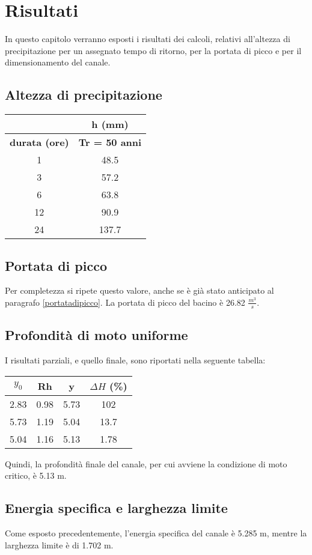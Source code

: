 \section{Risultati}
In questo capitolo verranno esposti i risultati dei calcoli, relativi all'altezza di precipitazione per un assegnato tempo di ritorno, per la portata di picco e per il dimensionamento del canale.
\subsection{Altezza di precipitazione}
\begin{table}[H] \centering
\begin{tabular}{cc}
                      & \textbf{h (mm)}       \\
\toprule
\textbf{durata (ore)} & \textbf{Tr = 50 anni} \\
\midrule
1                     & 48.5                  \\
3                     & 57.2                  \\
6                     & 63.8                  \\
12                    & 90.9                  \\
24                    & 137.7              \\
\bottomrule
\end{tabular}
\end{table}

\subsection{Portata di picco}
Per completezza si ripete questo valore, anche se è già stato anticipato al paragrafo \ref{portatadipicco}.
La portata di picco del bacino è 26.82 $\frac{m^3}{s}$.

\subsection{Profondità di moto uniforme}
I risultati parziali, e quello finale, sono riportati nella seguente tabella:
\begin{table}[H] \centering
\begin{tabular}{cccc}
\toprule
$y_0$ & Rh   & y    & $\Delta H$ (\%) \\
\midrule
2.83 & 0.98 & 5.73 & 102                          \\
5.73 & 1.19 & 5.04 & 13.7                         \\
5.04 & 1.16 & 5.13 & 1.78                          \\
\bottomrule
\end{tabular}
\end{table}
Quindi, la profondità finale del canale, per cui avviene la condizione di moto critico, è 5.13 m.
\subsection{Energia specifica e larghezza limite}
Come esposto precedentemente, l'energia specifica del canale è 5.285 m, mentre la larghezza limite è di 1.702 m.
